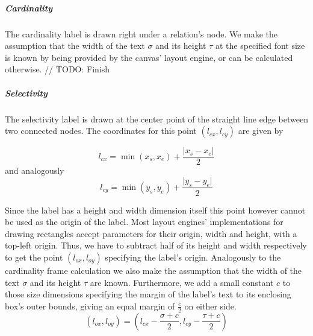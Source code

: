 \subparagraph{Cardinality} The cardinality label is drawn right under a relation's node. We make the assumption that the width of the text $\sigma$ and its height $\tau$ at the specified font size is known by being provided by the canvas' layout engine, or can be calculated otherwise.
// TODO: Finish

\subparagraph{Selectivity}
The selectivity label is drawn at the center point of the straight line edge between two connected nodes. The coordinates for this point $(l_{cx}, l_{cy})$ are given by

\begin{equation}
    l_{cx} = \min{(x_s, x_e)} + \frac{\vert x_s - x_e \vert}{2}
\end{equation}
and analogously
\begin{equation}
    l_{cy} = \min{(y_s, y_e)} + \frac{\vert y_s - y_e \vert}{2}
\end{equation}

Since the label has a height and width dimension itself this point however cannot be used as the origin of the label. Most layout engines' implementations for drawing rectangles accept parameters for their origin, width and height, with a top-left origin. Thus, we have to subtract half of its height and width respectively to get the point $(l_{ox}, l_{oy})$ specifying the label's origin. Analogously to the cardinality frame calculation we also make the assumption that the width of the text $\sigma$ and its height $\tau$ are known. Furthermore, we add a small constant $c$ to those size dimensions specifying the margin of the label's text to its enclosing box's outer bounds, giving an equal margin of $\frac{c}{2}$ on either side.
\begin{equation}
    (l_{ox}, l_{oy}) = (l_{cx} - \frac{\sigma + c}{2}, l_{cy} - \frac{\tau + c}{2})
\end{equation}




